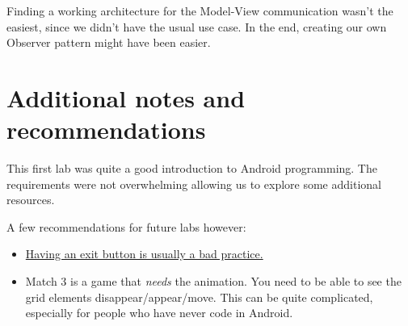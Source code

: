 \documentclass{article}
\begin{document}
Finding a working architecture for the Model-View communication wasn't the easiest, since we didn't have the usual use case. In the end, creating our own Observer pattern might have been easier.

\section{Additional notes and recommendations}

This first lab was quite a good introduction to Android programming. The requirements were not overwhelming allowing us to explore some additional resources. 

A few recommendations for future labs however:

\begin{itemize}
\item \href{https://www.quora.com/Why-dont-Android-apps-have-an-exit-button}{Having an exit button is usually a bad practice.}
\item Match 3 is a game that \textit{needs} the animation. You need to be able to see the grid elements disappear/appear/move. This can be quite complicated, especially for people who have never code in Android.
\end{itemize}
\end{document}
